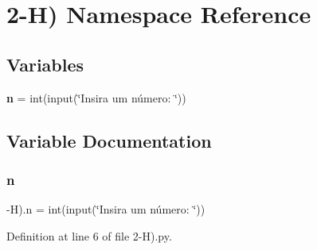 \section{2-\/H) Namespace Reference}
\label{namespace2-_h_08}
\subsection*{Variables}
\begin{DoxyCompactItemize}
\item 
\textbf{ n} = int(input(\char`\"{}Insira um número\+: \char`\"{}))
\end{DoxyCompactItemize}


\subsection{Variable Documentation}
\mbox{\label{namespace2-_h_08_a2e703189ef35e5f494d13c1a05d3898a}} 
\subsubsection{n}
{\footnotesize{}-\/H).n = int(input(\char`\"{}Insira um número\+: \char`\"{}))}



Definition at line 6 of file 2-\/\+H).\+py.

